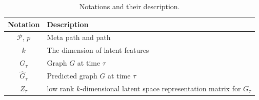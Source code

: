 \begin{table}[h]
\centering
\caption{Notations and their description.}
\scriptsize
\label{table_notations}
\begin{tabular}{|c|l|} \hline
\textbf{Notation} & \textbf{Description} \\ \hline
$\mathcal{P}$, $p$  & Meta path and path \\ \hline
$k$ & The dimension of latent features \\ \hline
$G_\tau$ & Graph $G$ at time $\tau$  \\ \hline
$\hat{G}_\tau$ & Predicted graph $G$ at time $\tau$  \\ \hline
$Z_\tau$ & low rank $k$-dimensional latent space representation matrix for $G_\tau$ \\ \hline


\end{tabular}
\end{table}


